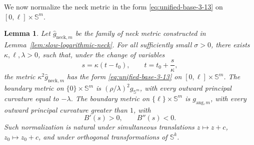 \documentclass[11pt,reqno]{amsart}
\newtheorem{lemma}[theorem]{Lemma}
\theoremstyle{definition}
\numberwithin{equation}{section}
\begin{document}
We now normalize the neck metric in the form \eqref{eq:unified-base-3-13} on
\([0,\ell]\times\mathbb S^m\). 
\begin{lemma}\label{lem:neck-endpoint-normalization}
Let \(\widehat g_{\mathrm{neck},m}\) be the family of neck metric 
constructed in Lemma~\ref{lem:slow-logarithmic-neck}.  For all
sufficiently small \(\sigma>0\), there exists
\(\kappa,\ell,\lambda>0\), such that, under the change of variables
\[
 s=\kappa(t-t_0),\qquad t=t_0+\frac{s}{\kappa},
\]
the metric \(\kappa^2\widehat g_{\mathrm{neck},m}\) has the form
\eqref{eq:unified-base-3-13} on
\([0,\ell]\times\mathbb S^m\).  The boundary metric on $\{0\}\times \mathbb S^m$ is
\((\rho/\lambda)^2g_{\mathbb S^m}\), with every outward
principal curvature equal to \(-\lambda\).  The boundary metric on $\{\ell\}\times \mathbb S^m$
is \(g_{\mathrm{ang},m}\), with every outward principal
curvature greater than \(1\), with
\[
                         B'(s)>0,\qquad B''(s)<0 .
\]
Such normalization is natural under simultaneous translations
\(z\mapsto z+c\), \(z_0\mapsto z_0+c\), and under orthogonal
transformations of \(\mathbb S^k\).
\end{lemma}
\end{document}
